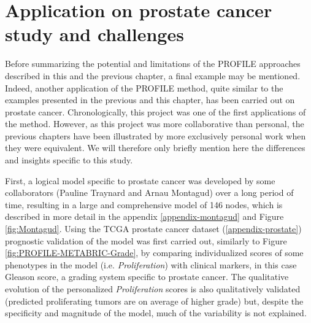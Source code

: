 \documentclass[a4paper,12pt,twoside,onecolumn,openright,final,oldfontcommands]{memoir}
\begin{document}
\section{Application on prostate cancer study and
challenges}\label{prostate-model}

Before summarizing the potential and limitations of the PROFILE
approaches described in this and the previous chapter, a final example
may be mentioned. Indeed, another application of the PROFILE method,
quite similar to the examples presented in the previous and this
chapter, has been carried out on prostate cancer. Chronologically, this
project was one of the first applications of the method. However, as
this project was more collaborative than personal, the previous chapters
have been illustrated by more exclusively personal work when they were
equivalent. We will therefore only briefly mention here the differences
and insights specific to this study.

First, a logical model specific to prostate cancer was developed by some
collaborators (Pauline Traynard and Arnau Montagud) over a long period
of time, resulting in a large and comprehensive model of 146 nodes,
which is described in more detail in the appendix
\ref{appendix-montagud} and Figure \ref{fig:Montagud}. Using the TCGA
prostate cancer dataset (\ref{appendix-prostate}) prognostic validation
of the model was first carried out, similarly to Figure
\ref{fig:PROFILE-METABRIC-Grade}, by comparing individualized scores of
some phenotypes in the model (i.e. \emph{Proliferation}) with clinical
markers, in this case Gleason score, a grading system specific to
prostate cancer. The qualitative evolution of the personalized
\emph{Proliferation} scores is also qualitatively validated (predicted
proliferating tumors are on average of higher grade) but, despite the
specificity and magnitude of the model, much of the variability is not
explained.
\end{document}
